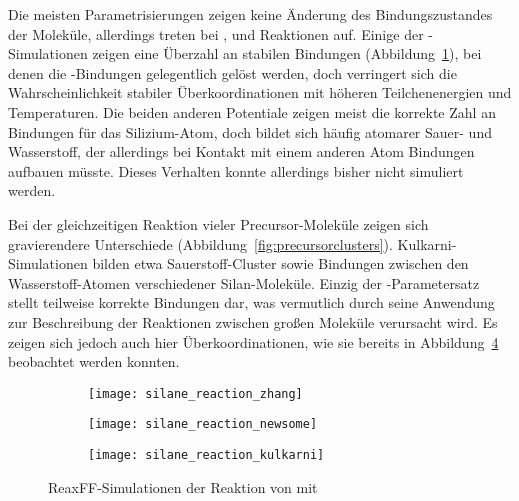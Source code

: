 Die meisten Parametrisierungen zeigen keine Änderung des Bindungszustandes der Moleküle, allerdings treten bei ,  und  Reaktionen auf.
Einige der -Simulationen zeigen eine Überzahl an stabilen Bindungen (Abbildung~\ref{fig:zhangreaction}), bei denen die -Bindungen gelegentlich gelöst werden, doch verringert sich die Wahrscheinlichkeit stabiler Überkoordinationen mit höheren Teilchenenergien und Temperaturen.
Die beiden anderen Potentiale zeigen meist die korrekte Zahl an Bindungen für das Silizium-Atom, doch bildet sich häufig atomarer Sauer- und Wasserstoff, der allerdings bei Kontakt mit einem anderen Atom Bindungen aufbauen müsste.
Dieses Verhalten konnte allerdings bisher nicht simuliert werden.

Bei der gleichzeitigen Reaktion vieler Precursor-Moleküle zeigen sich gravierendere Unterschiede (Abbildung~\ref{fig:precursorclusters}).
Kulkarni-Simulationen bilden etwa Sauerstoff-Cluster sowie Bindungen zwischen den Wasserstoff-Atomen verschiedener Silan-Moleküle.
Einzig der -Parametersatz stellt teilweise korrekte Bindungen dar, was vermutlich durch seine Anwendung zur Beschreibung der Reaktionen zwischen großen Moleküle verursacht wird.
Es zeigen sich jedoch auch hier Überkoordinationen, wie sie bereits in Abbildung~\ref{fig:precursorreactions} beobachtet werden konnten.

\begin{figure}[p]

  \captionsetup[subfigure]{singlelinecheck=false}
  \def\subfigwidth{0.32\textwidth}
  \begin{subfigure}[t]{3cm}
    \texttt{[image: silane\_reaction\_zhang]}
    \label{fig:zhangreaction}
  \end{subfigure}
  \hfill
  \begin{subfigure}[t]{5cm}
    \texttt{[image: silane\_reaction\_newsome]}
    \label{fig:newsomereaction}
  \end{subfigure}
  \hfill
  \begin{subfigure}[t]{4.5cm}
    \texttt{[image: silane\_reaction\_kulkarni]}
    \label{fig:kulkarnireaction}
  \end{subfigure}

  \caption{ReaxFF-Simulationen der Reaktion von  mit }
  \label{fig:precursorreactions}

\end{figure}


